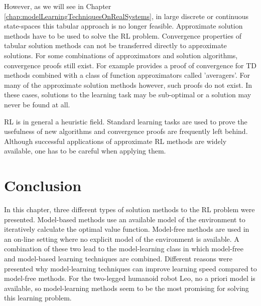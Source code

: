 \documentclass[a4paper,11pt]{mscLiterature}
\begin{document}
	However, as we will see in Chapter \ref{chap:modelLearningTechniquesOnRealSystems}, in large discrete or continuous state-spaces this tabular approach is no longer feasible. Approximate solution methods have to be used to solve the RL problem. Convergence properties of tabular solution methods can not be transferred directly to approximate solutions. For some combinations of approximators and solution algorithms, convergence proofs still exist. For example \cite{Gordon:95} provides a proof of convergence for TD methods combined with a class of function approximators called 'averagers'. For many of the approximate solution methods however, such proofs do not exist. In these cases, solutions to the learning task may be sub-optimal or a solution may never be found at all. 
	
	RL is in general a heuristic field. Standard learning tasks are used to prove the usefulness of new algorithms and convergence proofs are frequently left behind. Although successful applications of approximate RL methods are widely available, one has to be careful when applying them.

\section{Conclusion}
In this chapter, three different types of solution methods to the RL problem were presented. Model-based methods use an available model of the environment to iteratively calculate the optimal value function. Model-free methods are used in an on-line setting where no explicit model of the environment is available. A combination of these two lead to the model-learning class in which model-free and model-based learning techniques are combined. Different reasons were presented why model-learning techniques can improve learning speed compared to model-free methods. For the two-legged humanoid robot Leo, no a priori model is available, so model-learning methods seem to be the most promising for solving this learning problem.
\end{document}

